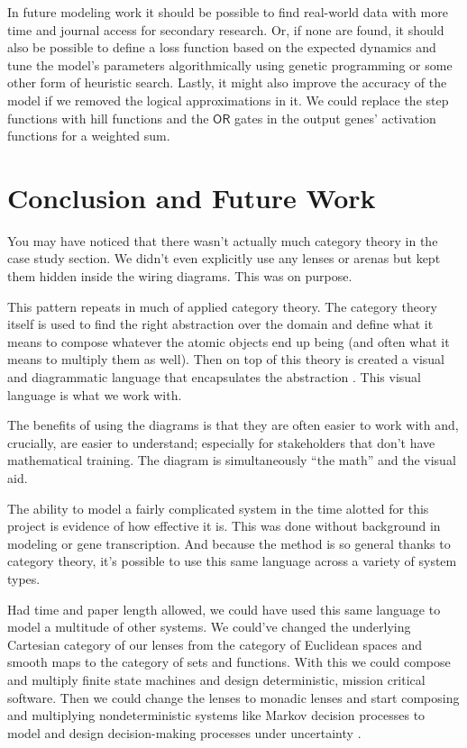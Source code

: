 \documentclass[12pt]{article}
\begin{document}
In future modeling work it should be possible to find real-world data with more time and journal access for secondary research.
Or, if none are found, it should also be possible to define a loss function based on the expected dynamics and tune the model's parameters algorithmically using genetic programming or some other form of heuristic search.
Lastly, it might also improve the accuracy of the model if we removed the logical approximations in it.
We could replace the step functions with hill functions and the $\mathsf{OR}$ gates in the output genes' activation functions for a weighted sum.




\section*{Conclusion and Future Work}
You may have noticed that there wasn't actually much category theory in the case study section.
We didn't even explicitly use any lenses or arenas but kept them hidden inside the wiring diagrams.
This was on purpose.

This pattern repeats in much of applied category theory.
The category theory itself is used to find the right abstraction over the domain and define what it means to compose whatever the atomic objects end up being (and often what it means to multiply them as well).
Then on top of this theory is created a visual and diagrammatic language that encapsulates the abstraction \cite{Coecke_Kissinger_2017, fong2019invitation,myers2022categorical}.
This visual language is what we work with.

The benefits of using the diagrams is that they are often easier to work with and, crucially, are easier to understand; especially for stakeholders that don't have mathematical training.
The diagram is simultaneously ``the math'' and the visual aid.


The ability to model a fairly complicated system in the time alotted for this project is evidence of how effective it is.
This was done without background in modeling or gene transcription.
And because the method is so general thanks to category theory, it's possible to use this same language across a variety of system types.

Had time and paper length allowed, we could have used this same language to model a multitude of other systems.
We could've changed the underlying Cartesian category of our lenses from the category of Euclidean spaces and smooth maps to the category of sets and functions.
With this we could compose and multiply finite state machines and design deterministic, mission critical software.
Then we could change the lenses to monadic lenses and start composing and multiplying nondeterministic systems like Markov decision processes to model and design decision-making processes under uncertainty \cite{myers2022categorical}.
\end{document}
